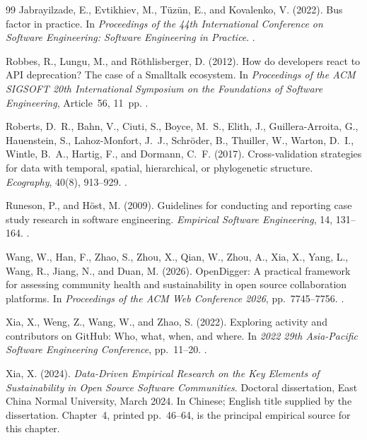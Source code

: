\clearpage
\begingroup
\renewcommand{\bibsection}{\section*{References\enspace{\normalfont\sffamily\fontsize{11}{14}\selectfont continued}}}
\begin{thebibliography}{99}
Jabrayilzade, E., Evtikhiev, M., Tüzün, E., and Kovalenko, V. (2022).
Bus factor in practice.
In \emph{Proceedings of the 44th International Conference on Software Engineering: Software Engineering in Practice}.
.

Robbes, R., Lungu, M., and Röthlisberger, D. (2012).
How do developers react to API deprecation? The case of a Smalltalk ecosystem.
In \emph{Proceedings of the ACM SIGSOFT 20th International Symposium on the Foundations of Software Engineering}, Article~56, 11~pp.
.

Roberts, D.~R., Bahn, V., Ciuti, S., Boyce, M.~S., Elith, J., Guillera-Arroita, G., Hauenstein, S., Lahoz-Monfort, J.~J., Schröder, B., Thuiller, W., Warton, D.~I., Wintle, B.~A., Hartig, F., and Dormann, C.~F. (2017).
Cross-validation strategies for data with temporal, spatial, hierarchical, or phylogenetic structure.
\emph{Ecography}, 40(8), 913--929.
.

Runeson, P., and Höst, M. (2009).
Guidelines for conducting and reporting case study research in software engineering.
\emph{Empirical Software Engineering}, 14, 131--164.
.

Wang, W., Han, F., Zhao, S., Zhou, X., Qian, W., Zhou, A., Xia, X., Yang, L., Wang, R., Jiang, N., and Duan, M. (2026).
OpenDigger: A practical framework for assessing community health and sustainability in open source collaboration platforms.
In \emph{Proceedings of the ACM Web Conference 2026}, pp.~7745--7756.
.

Xia, X., Weng, Z., Wang, W., and Zhao, S. (2022).
Exploring activity and contributors on GitHub: Who, what, when, and where.
In \emph{2022 29th Asia-Pacific Software Engineering Conference}, pp.~11--20.
.

Xia, X. (2024).
\emph{Data-Driven Empirical Research on the Key Elements of Sustainability in Open Source Software Communities}.
Doctoral dissertation, East China Normal University, March 2024. In Chinese; English title supplied by the dissertation. Chapter~4, printed pp.~46--64, is the principal empirical source for this chapter.


\end{thebibliography}
